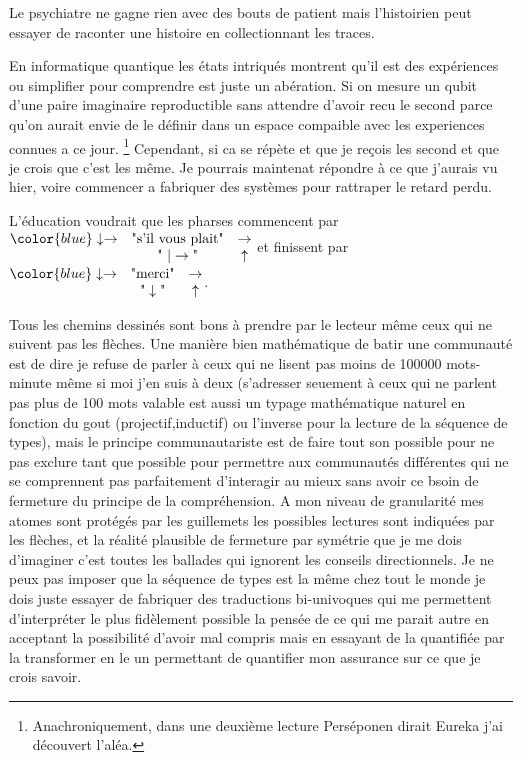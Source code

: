 \documentclass{article}
\newcommand{\blue}[1]{{\color{blue} #1}}
\begin{document}
Le psychiatre ne gagne rien avec des bouts de patient mais l'histoirien peut essayer de raconter une histoire en collectionnant les traces.



En informatique quantique  les états intriqués montrent qu'il est des expériences ou simplifier pour comprendre est juste un abération.
Si on mesure un qubit d'une paire imaginaire reproductible sans attendre d'avoir recu le second parce qu'on aurait envie de le définir dans un espace compaible avec les experiences connues a ce jour. \footnote{Anachroniquement, dans une deuxième lecture Perséponen dirait Eureka j'ai découvert l'aléa.}  
Cependant,  si ca se répète et que je reçois les second  et que je crois que c'est les même. Je pourrais maintenat répondre à ce que j'aurais vu hier, voire commencer a fabriquer des systèmes pour rattraper le retard perdu.

L'éducation voudrait que les pharses commencent par 
$ \begin{matrix} \blue{\downarrow \rightarrow } &\text {"s'il vous plait"}&\rightarrow \\
&\text{" }| \rightarrow \text{"}&\uparrow  \end{matrix}$ 
et finissent par $ \begin{matrix} \blue{\downarrow \rightarrow } &\text {"merci"}&\rightarrow \\
&\text{"}  \downarrow \text{"}&\uparrow  \end{matrix}$. 

Tous les chemins  dessinés sont bons à prendre par le lecteur même ceux qui ne suivent pas les flèches. Une manière bien mathématique de batir une communauté est de  dire je refuse de parler à ceux qui ne lisent pas moins  de 100000 mots-minute même si moi j'en suis à deux (s'adresser seuement à ceux qui ne parlent pas plus de 100 mots valable est aussi un typage mathématique  naturel en fonction du gout (projectif,inductif) ou l'inverse pour la lecture de la séquence de types), mais le principe communautariste est de faire tout son possible pour ne pas exclure tant que possible pour permettre aux communautés différentes qui ne se comprennent pas parfaitement d'interagir au mieux sans avoir ce bsoin de fermeture du principe de la compréhension. A mon niveau de granularité mes atomes sont protégés par les guillemets les possibles lectures 
sont indiquées par les flèches, et la réalité plausible de fermeture par symétrie que je me dois d'imaginer c'est toutes les ballades qui ignorent les conseils directionnels. Je ne peux pas imposer que la séquence de types est la même chez tout le monde je dois juste essayer de fabriquer des traductions bi-univoques qui me permettent d'interpréter le plus fidèlement possible la pensée de ce qui me parait autre en acceptant la possibilité d'avoir mal compris mais en essayant de la quantifiée par la transformer en le un permettant de quantifier mon assurance sur ce que je crois savoir. 
\end{document}
